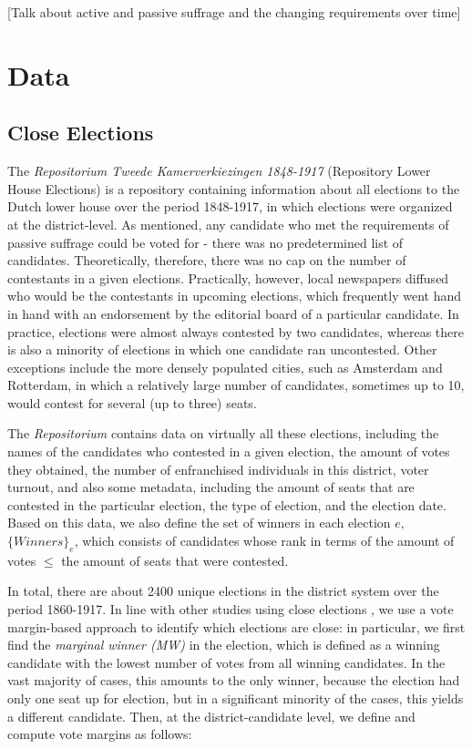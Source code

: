 \documentclass[12pt]{article}
\begin{document}
[Talk about active and passive suffrage and the changing requirements over time]


\section{Data}
\subsection{Close Elections}

The \textit{Repositorium Tweede Kamerverkiezingen 1848-1917} (Repository Lower House Elections) is a repository containing information about all elections to the Dutch lower house over the period 1848-1917, in which elections were organized at the district-level. As mentioned, any candidate who met the requirements of passive suffrage could be voted for - there was no predetermined list of candidates. Theoretically, therefore, there was no cap on the number of contestants in a given elections. Practically, however, local newspapers diffused who would be the contestants in upcoming elections, which frequently went hand in hand with an endorsement by the editorial board of a particular candidate. In practice, elections were almost always contested by two candidates, whereas there is also a minority of elections in which one candidate ran uncontested. Other exceptions include the more densely populated cities, such as Amsterdam and Rotterdam, in which a relatively large number of candidates, sometimes up to 10, would contest for several (up to three) seats. 

The \textit{Repositorium} contains data on virtually all these elections, including the names of the candidates who contested in a given election, the amount of votes they obtained, the number of enfranchised individuals in this district, voter turnout, and also some metadata, including the amount of seats that are contested in the particular election, the type of election, and the election date. Based on this data, we also define the set of winners in each election $e$, $\{ Winners \}_e$, which consists of candidates whose rank in terms of the amount of votes $\leq$ the amount of seats that were contested. 

In total, there are about 2400 unique elections in the district system over the period 1860-1917. In line with other studies using close elections \citep[e.g.][]{lee2008randomized}, we use a vote margin-based approach to identify which elections are close: in particular, we first find the \textit{marginal winner (MW)} in the election, which is defined as a winning candidate with the lowest number of votes from all winning candidates. In the vast majority of cases, this amounts to the only winner, because the election had only one seat up for election, but in a significant minority of the cases, this yields a different candidate. Then, at the district-candidate level, we define and compute vote margins as follows:
\end{document}
